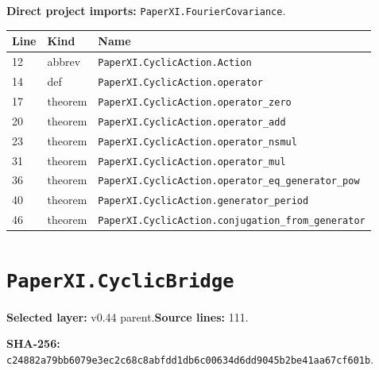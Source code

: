 \documentclass[10pt,oneside]{book}
\begin{document}

\textbf{Direct project imports:} \nolinkurl{PaperXI.FourierCovariance}.

\begin{longtable}{@{}p{}p{}p{}@{}}\toprule Line&Kind&Name\\\midrule\endhead

12&abbrev&\nolinkurl{PaperXI.CyclicAction.Action}\\

14&def&\nolinkurl{PaperXI.CyclicAction.operator}\\

17&theorem&\nolinkurl{PaperXI.CyclicAction.operator_zero}\\

20&theorem&\nolinkurl{PaperXI.CyclicAction.operator_add}\\

23&theorem&\nolinkurl{PaperXI.CyclicAction.operator_nsmul}\\

31&theorem&\nolinkurl{PaperXI.CyclicAction.operator_mul}\\

36&theorem&\nolinkurl{PaperXI.CyclicAction.operator_eq_generator_pow}\\

40&theorem&\nolinkurl{PaperXI.CyclicAction.generator_period}\\

46&theorem&\nolinkurl{PaperXI.CyclicAction.conjugation_from_generator}\\

\bottomrule\end{longtable}

\section{\texorpdfstring{\nolinkurl{PaperXI.CyclicBridge}}{PaperXI.CyclicBridge}}\label{module:PaperXI.CyclicBridge}

\textbf{Selected layer:} v0.44 parent.\quad\textbf{Source lines:} 111.\par\textbf{SHA-256:} {\scriptsize\nolinkurl{c24882a79bb6079e3ec2c68c8abfdd1db6c00634d6dd9045b2be41aa67cf601b}}.

\end{document}
